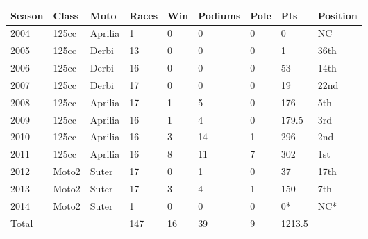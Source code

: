 \documentclass{article}
\begin{document}
\begin{tabular}{lllllllll}
\toprule
Season & Class & Moto & Races & Win & Podiums & Pole & Pts & Position \\
\midrule
2004 & 125cc & Aprilia & 1 & 0 & 0 & 0 & 0 & NC \\
2005 & 125cc & Derbi & 13 & 0 & 0 & 0 & 1 & 36th \\
2006 & 125cc & Derbi & 16 & 0 & 0 & 0 & 53 & 14th \\
2007 & 125cc & Derbi & 17 & 0 & 0 & 0 & 19 & 22nd \\
2008 & 125cc & Aprilia & 17 & 1 & 5 & 0 & 176 & 5th \\
2009 & 125cc & Aprilia & 16 & 1 & 4 & 0 & 179.5 & 3rd \\
2010 & 125cc & Aprilia & 16 & 3 & 14 & 1 & 296 & 2nd \\
2011 & 125cc & Aprilia & 16 & 8 & 11 & 7 & 302 & 1st \\
2012 & Moto2 & Suter & 17 & 0 & 1 & 0 & 37 & 17th \\
2013 & Moto2 & Suter & 17 & 3 & 4 & 1 & 150 & 7th \\
2014 & Moto2 & Suter & 1 & 0 & 0 & 0 & 0* & NC* \\
Total &  &  & 147 & 16 & 39 & 9 & 1213.5 &  \\
\bottomrule
\end{tabular}
\end{document}
